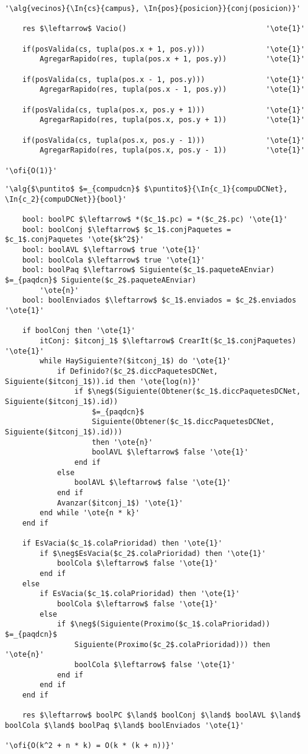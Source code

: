 \begin{lstlisting}[mathescape]
'\alg{vecinos}{\In{cs}{campus}, \In{pos}{posicion}}{conj(posicion)}'

	res $\leftarrow$ Vacio() 								'\ote{1}'

	if(posValida(cs, tupla(pos.x + 1, pos.y))) 				'\ote{1}'
		AgregarRapido(res, tupla(pos.x + 1, pos.y))			'\ote{1}'	

	if(posValida(cs, tupla(pos.x - 1, pos.y))) 				'\ote{1}'
		AgregarRapido(res, tupla(pos.x - 1, pos.y))			'\ote{1}'	

	if(posValida(cs, tupla(pos.x, pos.y + 1))) 				'\ote{1}'
		AgregarRapido(res, tupla(pos.x, pos.y + 1))			'\ote{1}'

	if(posValida(cs, tupla(pos.x, pos.y - 1)))				'\ote{1}'
		AgregarRapido(res, tupla(pos.x, pos.y - 1))			'\ote{1}'

'\ofi{O(1)}'
\end{lstlisting}

\begin{lstlisting}[mathescape]
'\alg{$\puntito$ $=_{compudcn}$ $\puntito$}{\In{c_1}{compuDCNet}, \In{c_2}{compuDCNet}}{bool}'

	bool: boolPC $\leftarrow$ *($c_1$.pc) = *($c_2$.pc) '\ote{1}'
	bool: boolConj $\leftarrow$ $c_1$.conjPaquetes = $c_1$.conjPaquetes '\ote{$k^2$}'
	bool: boolAVL $\leftarrow$ true '\ote{1}'
	bool: boolCola $\leftarrow$ true '\ote{1}'
	bool: boolPaq $\leftarrow$ Siguiente($c_1$.paqueteAEnviar) $=_{paqdcn}$ Siguiente($c_2$.paqueteAEnviar)
		'\ote{n}'
	bool: boolEnviados $\leftarrow$ $c_1$.enviados = $c_2$.enviados '\ote{1}'

	if boolConj then '\ote{1}'
		itConj: $itconj_1$ $\leftarrow$ CrearIt($c_1$.conjPaquetes) '\ote{1}'
		while HaySiguiente?($itconj_1$) do '\ote{1}'
			if Definido?($c_2$.diccPaquetesDCNet, Siguiente($itconj_1$)).id then '\ote{log(n)}'
				if $\neg$(Siguiente(Obtener($c_1$.diccPaquetesDCNet, Siguiente($itconj_1$).id))
					$=_{paqdcn}$
					Siguiente(Obtener($c_1$.diccPaquetesDCNet, Siguiente($itconj_1$).id)))
					then '\ote{n}'
					boolAVL $\leftarrow$ false '\ote{1}'
				end if
			else
				boolAVL $\leftarrow$ false '\ote{1}'
			end if
			Avanzar($itconj_1$) '\ote{1}'
		end while '\ote{n * k}'
	end if

	if EsVacia($c_1$.colaPrioridad) then '\ote{1}'
		if $\neg$EsVacia($c_2$.colaPrioridad) then '\ote{1}'
			boolCola $\leftarrow$ false '\ote{1}'
		end if
	else
		if EsVacia($c_1$.colaPrioridad) then '\ote{1}'
			boolCola $\leftarrow$ false '\ote{1}'
		else
			if $\neg$(Siguiente(Proximo($c_1$.colaPrioridad)) $=_{paqdcn}$
				Siguiente(Proximo($c_2$.colaPrioridad))) then '\ote{n}'
				boolCola $\leftarrow$ false '\ote{1}'
			end if
		end if
	end if

	res $\leftarrow$ boolPC $\land$ boolConj $\land$ boolAVL $\land$ boolCola $\land$ boolPaq $\land$ boolEnviados '\ote{1}'

'\ofi{O(k^2 + n * k) = O(k * (k + n))}'
\end{lstlisting}

